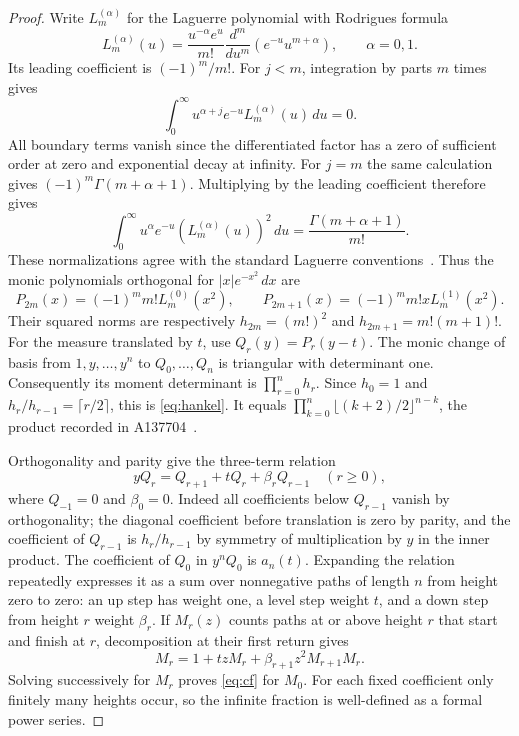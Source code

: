 \documentclass[11pt]{article}
\begin{document}
\begin{proof}
Write $L_m^{(\alpha)}$ for the Laguerre polynomial with Rodrigues formula
\[
 L_m^{(\alpha)}(u)=\frac{u^{-\alpha}e^u}{m!}
       \frac{d^m}{du^m}(e^{-u}u^{m+\alpha}),\qquad\alpha=0,1.
\]
Its leading coefficient is $(-1)^m/m!$. For $j<m$, integration by
parts $m$ times gives
\[
 \int_0^\infty u^{\alpha+j}e^{-u}L_m^{(\alpha)}(u)\,du=0.
\]
All boundary terms vanish since the differentiated factor has a zero
of sufficient order at zero and exponential decay at infinity.
For $j=m$ the same calculation gives
$(-1)^m\Gamma(m+\alpha+1)$. Multiplying by the leading coefficient
therefore gives
\[
 \int_0^\infty u^\alpha e^{-u}(L_m^{(\alpha)}(u))^2\,du
 =\frac{\Gamma(m+\alpha+1)}{m!}.
\]
These normalizations agree with the standard Laguerre
conventions~\cite[Sections 18.3 and 18.5]{dlmf}.
Thus the monic polynomials orthogonal for $|x|e^{-x^2}\,dx$ are
\[
 P_{2m}(x)=(-1)^mm!L_m^{(0)}(x^2),\qquad
 P_{2m+1}(x)=(-1)^mm!xL_m^{(1)}(x^2).
\]
Their squared norms are respectively
$h_{2m}=(m!)^2$ and $h_{2m+1}=m!(m+1)!$.
For the measure translated by $t$, use $Q_r(y)=P_r(y-t)$.
The monic change of basis from $1,y,\ldots,y^n$ to $Q_0,\ldots,Q_n$
is triangular with determinant one. Consequently its moment determinant
is $\prod_{r=0}^nh_r$. Since $h_0=1$ and
$h_r/h_{r-1}=\lceil r/2\rceil$, this is \eqref{eq:hankel}.
It equals $\prod_{k=0}^n\lfloor(k+2)/2\rfloor^{n-k}$, the product
recorded in A137704~\cite{oeis-hankel}.

Orthogonality and parity give the three-term relation
\[
 yQ_r=Q_{r+1}+tQ_r+\beta_rQ_{r-1}\quad(r\geq0),
\]
where $Q_{-1}=0$ and $\beta_0=0$.
Indeed all coefficients below $Q_{r-1}$ vanish by orthogonality;
the diagonal coefficient before translation is zero by parity, and
the coefficient of $Q_{r-1}$ is $h_r/h_{r-1}$ by symmetry of
multiplication by $y$ in the inner product.
The coefficient of $Q_0$ in $y^nQ_0$ is $a_n(t)$.
Expanding the relation repeatedly expresses it as a sum over
nonnegative paths of length $n$ from height zero to zero: an up step
has weight one, a level step weight $t$, and a down step from height
$r$ weight $\beta_r$. If $M_r(z)$ counts paths at or above height $r$
that start and finish at $r$, decomposition at their first return gives
\[
 M_r=1+tzM_r+\beta_{r+1}z^2M_{r+1}M_r.
\]
Solving successively for $M_r$ proves \eqref{eq:cf} for $M_0$.
For each fixed coefficient only finitely many heights occur, so the
infinite fraction is well-defined as a formal power series.
\end{proof}
\end{document}
